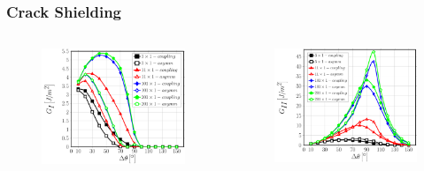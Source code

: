 \documentclass[first,firstsupp,lastsupp,last,hyperref,table]{ETHclass}
\begin{document}
\begin{frame}
\frametitle{\vspace{0.2cm}\small Crack Shielding}
\vspace{-1cm}
\centering
\begin{columns}[c]
\centering
\begin{column}{0.5\textwidth}
\centering
\begin{figure}
\centering
\includegraphics[width=\columnwidth]{nx1-coupling-vf60-GI-crackshield3.pdf}
\end{figure}
\end{column}
\begin{column}{0.5\textwidth}
\centering
\begin{figure}
\centering
\includegraphics[width=\columnwidth]{nx1-coupling-vf60-GII-crackshield3.pdf}

\end{figure}
\end{column}
\end{columns}
\end{frame}
\end{document}

